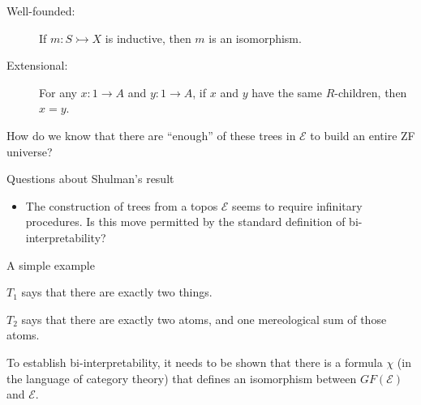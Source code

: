 \documentclass[ignorenonframetext,fleqn]{beamer}
\newcommand{\2}{\mathcal}
\begin{document}
 \begin{frame}

   \begin{description}
   \item[Well-founded:] If $m:S\rightarrowtail X$ is inductive, then
     $m$ is an isomorphism.
   \item[Extensional:] For any $x:1\to A$ and $y:1\to A$, if $x$ and
     $y$ have the same $R$-children, then $x=y$.
   \end{description}

 \end{frame}
  

\begin{frame}

  How do we know that there are ``enough'' of these trees in $\2E$ to
  build an entire ZF universe?


\end{frame}

\begin{frame}{Questions about Shulman's result}

  \begin{itemize}
  \item The construction of trees from a topos $\2E$ seems to require
    infinitary procedures. Is this move permitted by the standard
    definition of bi-interpretability?
  \end{itemize}


\end{frame}

\begin{frame}{A simple example}

  $T_1$ says that there are exactly two things.

  $T_2$ says that there are exactly two atoms, and one mereological
  sum of those atoms.

  
  



\end{frame}



\begin{frame}

  To establish bi-interpretability, it needs to be shown that there is
  a formula $\chi$ (in the language of category theory) that defines
  an isomorphism between $GF(\2E )$ and $\2E$.


\end{frame}
\end{document}
